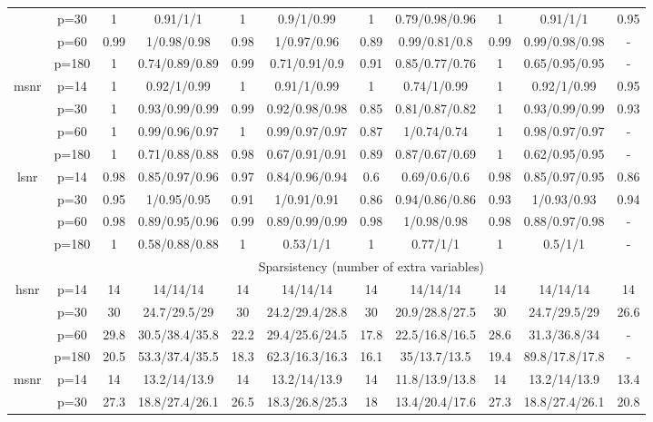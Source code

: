 \begin{table}[ht]
{\begin{tabular}{|c|c|cc|cc|cc|cc|c|}
   & p=30 & 1 & 0.91/1/1 & 1 & 0.9/1/0.99 & 1 & 0.79/0.98/0.96 & 1 & 0.91/1/1 & 0.95 \\ 
   & p=60 & 0.99 & 1/0.98/0.98 & 0.98 & 1/0.97/0.96 & 0.89 & 0.99/0.81/0.8 & 0.99 & 0.99/0.98/0.98 & - \\ 
   & p=180 & 1 & 0.74/0.89/0.89 & 0.99 & 0.71/0.91/0.9 & 0.91 & 0.85/0.77/0.76 & 1 & 0.65/0.95/0.95 & - \\ 
  \midrule\multirow{4}[2]{*}{msnr} & p=14 & 1 & 0.92/1/0.99 & 1 & 0.91/1/0.99 & 1 & 0.74/1/0.99 & 1 & 0.92/1/0.99 & 0.95 \\ 
   & p=30 & 1 & 0.93/0.99/0.99 & 0.99 & 0.92/0.98/0.98 & 0.85 & 0.81/0.87/0.82 & 1 & 0.93/0.99/0.99 & 0.93 \\ 
   & p=60 & 1 & 0.99/0.96/0.97 & 1 & 0.99/0.97/0.97 & 0.87 & 1/0.74/0.74 & 1 & 0.98/0.97/0.97 & - \\ 
   & p=180 & 1 & 0.71/0.88/0.88 & 0.98 & 0.67/0.91/0.91 & 0.89 & 0.87/0.67/0.69 & 1 & 0.62/0.95/0.95 & - \\ 
  \midrule\multirow{4}[2]{*}{lsnr} & p=14 & 0.98 & 0.85/0.97/0.96 & 0.97 & 0.84/0.96/0.94 & 0.6 & 0.69/0.6/0.6 & 0.98 & 0.85/0.97/0.95 & 0.86 \\ 
   & p=30 & 0.95 & 1/0.95/0.95 & 0.91 & 1/0.91/0.91 & 0.86 & 0.94/0.86/0.86 & 0.93 & 1/0.93/0.93 & 0.94 \\ 
   & p=60 & 0.98 & 0.89/0.95/0.96 & 0.99 & 0.89/0.99/0.99 & 0.98 & 1/0.98/0.98 & 0.98 & 0.88/0.97/0.98 & - \\ 
   & p=180 & 1 & 0.58/0.88/0.88 & 1 & 0.53/1/1 & 1 & 0.77/1/1 & 1 & 0.5/1/1 & - \\ 
   \midrule 
 \multicolumn{1}{|c}{} &       & \multicolumn{9}{c|}{Sparsistency (number of extra variables)} \\
\midrule\multirow{4}[2]{*}{hsnr} & p=14 & 14 & 14/14/14 & 14 & 14/14/14 & 14 & 14/14/14 & 14 & 14/14/14 & 14 \\ 
   & p=30 & 30 & 24.7/29.5/29 & 30 & 24.2/29.4/28.8 & 30 & 20.9/28.8/27.5 & 30 & 24.7/29.5/29 & 26.6 \\ 
   & p=60 & 29.8 & 30.5/38.4/35.8 & 22.2 & 29.4/25.6/24.5 & 17.8 & 22.5/16.8/16.5 & 28.6 & 31.3/36.8/34 & - \\ 
   & p=180 & 20.5 & 53.3/37.4/35.5 & 18.3 & 62.3/16.3/16.3 & 16.1 & 35/13.7/13.5 & 19.4 & 89.8/17.8/17.8 & - \\ 
  \midrule\multirow{4}[2]{*}{msnr} & p=14 & 14 & 13.2/14/13.9 & 14 & 13.2/14/13.9 & 14 & 11.8/13.9/13.8 & 14 & 13.2/14/13.9 & 13.4 \\ 
   & p=30 & 27.3 & 18.8/27.4/26.1 & 26.5 & 18.3/26.8/25.3 & 18 & 13.4/20.4/17.6 & 27.3 & 18.8/27.4/26.1 & 20.8 \\ 

\end{tabular}}
\end{table}
